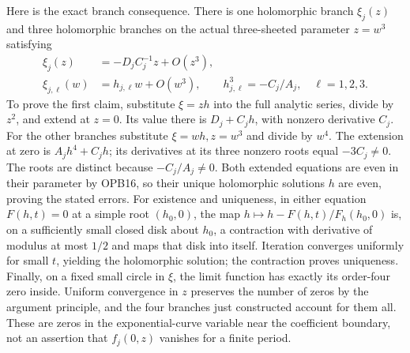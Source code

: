 \documentclass[11pt]{article}
\begin{document}
Here is the exact branch consequence. There is one holomorphic branch
$\xi_j(z)$ and three holomorphic branches on the actual three-sheeted
parameter $z=w^3$ satisfying
\[
 \begin{split}
 \xi_j(z)&=-D_jC_j^{-1}z+O(z^3),\\
 \xi_{j,\ell}(w)&=h_{j,\ell}w+O(w^3),\qquad
 h_{j,\ell}^3=-C_j/A_j,\quad \ell=1,2,3.
 \end{split}\tag{OPB18}
\]
To prove the first claim, substitute $\xi=zh$ into the full analytic
series, divide by $z^2$, and extend at $z=0$. Its value there is
$D_j+C_jh$, with nonzero derivative $C_j$. For the other branches
substitute $\xi=wh,z=w^3$ and divide by $w^4$. The extension at zero
is $A_jh^4+C_jh$; its derivatives at its three nonzero roots equal
$-3C_j\ne0$. The roots are distinct because $-C_j/A_j\ne0$.
Both extended equations are even in their parameter by OPB16, so their
unique holomorphic solutions $h$ are even, proving the stated errors.
For existence and uniqueness, in either equation $F(h,t)=0$ at a simple
root $(h_0,0)$, the map $h\mapsto h-F(h,t)/F_h(h_0,0)$ is, on a
sufficiently small closed disk about $h_0$, a contraction with derivative
of modulus at most $1/2$ and maps that disk into itself. Iteration
converges uniformly for small $t$, yielding the holomorphic solution;
the contraction proves uniqueness. Finally, on a fixed small circle in
$\xi$, the limit function has exactly its order-four zero inside.
Uniform convergence in $z$ preserves the number of zeros by the argument
principle, and the four branches just constructed account for them all.
These are zeros in the exponential-curve variable near the coefficient
boundary, not an assertion that $f_j(0,z)$ vanishes for a finite period.
\end{document}
